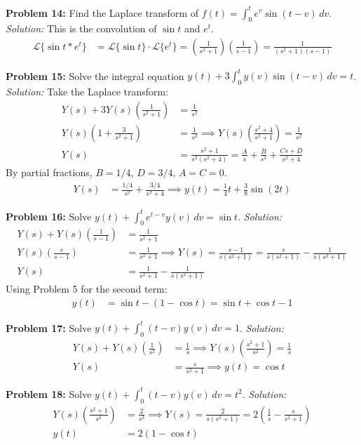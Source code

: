\documentclass[11pt, letterpaper]{article}
\theoremstyle{definition}
\theoremstyle{remark}
\begin{document}
\textbf{Problem 14:} Find the Laplace transform of $f(t) = \int_0^t e^v \sin(t-v) \, dv$.
\textit{Solution:}
This is the convolution of $\sin t$ and $e^t$.
\begin{align*}
\mathscr{L}\{\sin t * e^t\} &= \mathscr{L}\{\sin t\} \cdot \mathscr{L}\{e^t\} = \left(\frac{1}{s^2+1}\right)\left(\frac{1}{s-1}\right) = \frac{1}{(s^2+1)(s-1)}
\end{align*}

\textbf{Problem 15:} Solve the integral equation $y(t) + 3\int_0^t y(v)\sin(t-v) \, dv = t$.
\textit{Solution:}
Take the Laplace transform:
\begin{align*}
Y(s) + 3Y(s)\left(\frac{1}{s^2+1}\right) &= \frac{1}{s^2} \\[4pt]
Y(s)\left(1 + \frac{3}{s^2+1}\right) &= \frac{1}{s^2} \implies Y(s)\left(\frac{s^2+4}{s^2+1}\right) = \frac{1}{s^2} \\[4pt]
Y(s) &= \frac{s^2+1}{s^2(s^2+4)} = \frac{A}{s} + \frac{B}{s^2} + \frac{Cs+D}{s^2+4}
\end{align*}
By partial fractions, $B = 1/4$, $D = 3/4$, $A=C=0$.
\begin{align*}
Y(s) &= \frac{1/4}{s^2} + \frac{3/4}{s^2+4} \implies y(t) = \frac{1}{4}t + \frac{3}{8}\sin(2t)
\end{align*}

\textbf{Problem 16:} Solve $y(t) + \int_0^t e^{t-v}y(v) \, dv = \sin t$.
\textit{Solution:}
\begin{align*}
Y(s) + Y(s)\left(\frac{1}{s-1}\right) &= \frac{1}{s^2+1} \\[4pt]
Y(s)\left(\frac{s}{s-1}\right) &= \frac{1}{s^2+1} \implies Y(s) = \frac{s-1}{s(s^2+1)} = \frac{s}{s(s^2+1)} - \frac{1}{s(s^2+1)} \\[4pt]
Y(s) &= \frac{1}{s^2+1} - \frac{1}{s(s^2+1)}
\end{align*}
Using Problem 5 for the second term:
\begin{align*}
y(t) &= \sin t - (1 - \cos t) = \sin t + \cos t - 1
\end{align*}

\textbf{Problem 17:} Solve $y(t) + \int_0^t (t-v)y(v) \, dv = 1$.
\textit{Solution:}
\begin{align*}
Y(s) + Y(s)\left(\frac{1}{s^2}\right) &= \frac{1}{s} \implies Y(s)\left(\frac{s^2+1}{s^2}\right) = \frac{1}{s} \\[4pt]
Y(s) &= \frac{s}{s^2+1} \implies y(t) = \cos t
\end{align*}

\textbf{Problem 18:} Solve $y(t) + \int_0^t (t-v)y(v) \, dv = t^2$.
\textit{Solution:}
\begin{align*}
Y(s)\left(\frac{s^2+1}{s^2}\right) &= \frac{2}{s^3} \implies Y(s) = \frac{2}{s(s^2+1)} = 2\left(\frac{1}{s} - \frac{s}{s^2+1}\right) \\[4pt]
y(t) &= 2(1 - \cos t)
\end{align*}
\end{document}
